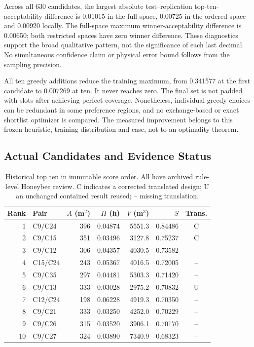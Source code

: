 \documentclass{llncs}
\begin{document}
Across all 630 candidates, the largest absolute test--replication top-ten-acceptability difference is 0.01015 in the full space, 0.00725 in the ordered space and 0.00920 locally. The full-space maximum winner-acceptability difference is 0.00650; both restricted spaces have zero winner difference. These diagnostics support the broad qualitative pattern, not the significance of each last decimal. No simultaneous confidence claim or physical error bound follows from the sampling precision.

All ten greedy additions reduce the training maximum, from 0.341577 at the first candidate to 0.007269 at ten. It never reaches zero. The final set is not padded with slots after achieving perfect coverage. Nonetheless, individual greedy choices can be redundant in some preference regions, and no exchange-based or exact shortlist optimizer is compared. The measured improvement belongs to this frozen heuristic, training distribution and case, not to an optimality theorem.

\subsection{Actual Candidates and Evidence Status}
\begin{table}[tbp]\caption{Historical top ten in immutable score order. All have archived rule-level Honeybee review. C indicates a corrected translated design; U an unchanged contained result reused; -- missing translation.}\label{tab:historical}\centering
\small
\begin{tabular}{rlrrrrc}\toprule
Rank & Pair & $A$ (m$^2$) & $H$ (h) & $V$ (m$^3$) & $S$ & Trans.\\\midrule
1 & C9/C24 & 396 & 0.04874 & 5551.3 & 0.84486 & C\\
2 & C9/C15 & 351 & 0.03496 & 3127.8 & 0.75237 & C\\
3 & C9/C12 & 306 & 0.04357 & 4030.5 & 0.73582 & --\\
4 & C15/C24 & 243 & 0.05367 & 4016.5 & 0.72005 & --\\
5 & C9/C35 & 297 & 0.04481 & 5303.3 & 0.71420 & --\\
6 & C9/C13 & 333 & 0.03028 & 2975.2 & 0.70832 & U\\
7 & C12/C24 & 198 & 0.06228 & 4919.3 & 0.70350 & --\\
8 & C9/C21 & 333 & 0.03250 & 4252.0 & 0.70229 & --\\
9 & C9/C26 & 315 & 0.03520 & 3906.1 & 0.70170 & --\\
10 & C9/C27 & 324 & 0.03890 & 7340.9 & 0.68323 & --\\
\bottomrule\end{tabular}

\end{table}
\end{document}
